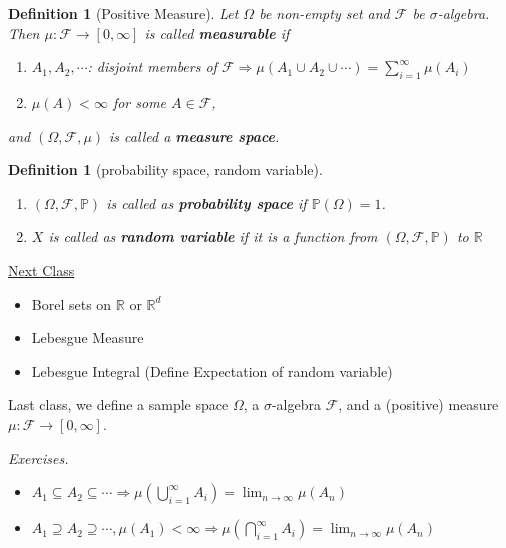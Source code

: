 \documentclass[12pt]{report}
\renewcommand{\subset}{\subseteq}
\renewcommand{\supset}{\supseteq}
\theoremstyle{break}
\theoremstyle{newdef}
\newtheorem{defn}[thm]{Definition} %
\theoremstyle{remark}
\begin{document}
\begin{defn}[Positive Measure]
Let $\Omega$ be non-empty set and $\mathcal{F}$ be $\sigma$-algebra.
Then $\mu: \mathcal{F} \rightarrow [0,\infty]$ is called \textbf{measurable} if
\begin{enumerate}
\item $A_1, A_2, \cdots$: disjoint members of $\mathcal{F} \Rightarrow \mu(A_1\cup A_2\cup \cdots) = \sum_{i=1}^\infty \mu(A_i)$
\item $\mu(A) < \infty$ for some $A \in \mathcal{F}$,
\end{enumerate}
and $(\Omega, \mathcal{F}, \mu)$ is called a \textbf{measure space}.
\end{defn}


\begin{defn}[probability space, random variable]
\leavevmode
\vspace{-6mm}
\begin{enumerate}
\item $(\Omega, \mathcal{F}, \mathbb{P})$ is called as \textbf{probability space} if $\mathbb{P}(\Omega) = 1$.
\item $X$ is called as \textbf{random variable} if it is a function from $(\Omega, \mathcal{F}, \mathbb{P})$ to $\mathbb{R}$
\end{enumerate}
\end{defn}

\underline{Next Class}
\begin{itemize}
\item Borel sets on $\mathbb{R}$ or $\mathbb{R}^d$
\item Lebesgue Measure
\item Lebesgue Integral (Define Expectation of random variable)
\end{itemize}

\vspace{5mm}

Last class, we define a sample space $\Omega$, a $\sigma$-algebra $\mathcal{F}$, and a (positive) measure $\mu : \mathcal{F} \rightarrow [0,\infty]$.
\vspace{5mm}

\textit{Exercises.}
\begin{itemize}
\item $A_1 \subset A_2 \subset \cdots \Rightarrow \mu(\bigcup_{i=1}^\infty A_i) = \lim_{n\rightarrow\infty}\mu(A_n)$
\item $A_1 \supset A_2 \supset \cdots, \mu(A_1) < \infty \Rightarrow \mu(\bigcap_{i=1}^\infty A_i) = \lim_{n\rightarrow\infty}\mu(A_n)$
\end{itemize}
\end{document}
